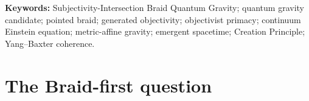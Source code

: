 \documentclass[11pt]{article}
\theoremstyle{definition}
\theoremstyle{remark}
\begin{document}
\begin{abstract}
This result strengthens the constructive refutation of \emph{objectivist primacy}: neither the shared tensor carrier nor its numerical four-dimensional type must be installed as a completed objective background. Objectivity is retained as covariance and inter-presentation stability while its ontological priority is denied as a universal necessity. The construction is nevertheless not a completed quantum-gravity theory. CGR and MMR remain explicit non-Braid-derived principles, the tested temporal four-flow distribution is noninvolutive, and the continuum gravitational field has not been quantized. No ultraviolet completion or empirical gravitational identification is claimed. The result is an explicit and falsifiable Braid-based quantum-gravity candidate grounded in subjectivity intersection.
\end{abstract}

\noindent\textbf{Keywords:} Subjectivity-Intersection Braid Quantum Gravity; quantum gravity candidate; pointed braid; generated objectivity; objectivist primacy; continuum Einstein equation; metric-affine gravity; emergent spacetime; Creation Principle; Yang--Baxter coherence.

\section{The Braid-first question}
\end{document}

